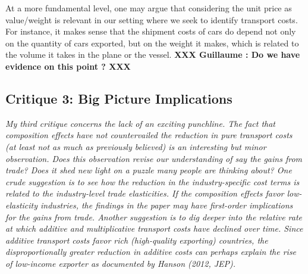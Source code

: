 \documentclass[a4paper,11pt]{article}
\begin{document}
At a more fundamental level, one may argue that considering the unit price as value/weight is relevant in our setting where we seek to identify transport costs. For instance, it makes sense that the shipment costs of cars do depend not only on the quantity of cars exported, but on the weight it makes, which is related to the volume it takes in the plane or the vessel. \textbf{XXX Guillaume : Do we have evidence on this point ? XXX} 




\subsection{Critique 3: Big Picture Implications}

\textit{My third critique concerns the lack of an exciting punchline. The fact that
composition effects have not countervailed the reduction in pure transport costs
(at least not as much as previously believed) is an interesting but minor observation.
Does this observation revise our understanding of say the gains from
trade? Does it shed new light on a puzzle many people are thinking about?
One crude suggestion is to see how the reduction in the industry-specific cost
terms is related to the industry-level trade elasticities. If the composition effects
favor low-elasticity industries, the findings in the paper may have first-order
implications for the gains from trade.
Another suggestion is to dig deeper into the relative rate at which additive
and multiplicative transport costs have declined over time. Since additive transport
costs favor rich (high-quality exporting) countries, the disproportionally
greater reduction in additive costs can perhaps explain the rise of low-income
exporter as documented by Hanson (2012, JEP).}
\end{document}
